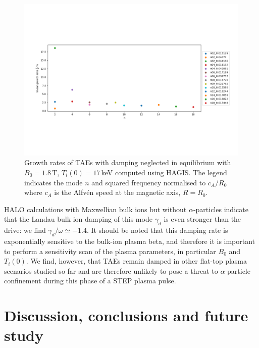 \documentclass[10pt, a4paper, twoside]{article}
\begin{document}
\begin{figure}[htpb]
    \centering
    \includegraphics[width=1.0\linewidth]{Figures/TAE_figure.pdf}
    \caption{Growth rates of TAEs with damping neglected in equilibrium with $B_0 = 1.8\,$T, $T_i(0) = 17\,$keV computed using HAGIS. The legend indicates the mode $n$ and squared frequency normalised to $c_A/R_0$ where $c_A$ is the Alfv\'en speed at the magnetic axis, $R=R_0$.}
    \label{fig:TAEs}
\end{figure}

HALO calculations with Maxwellian bulk ions but without $\alpha$-particles indicate that the Landau bulk ion damping of this mode $\gamma_d$ is even stronger than the drive: we find $\gamma_d/\omega \simeq -1.4$. It should be noted that this damping rate is exponentially sensitive to the bulk-ion plasma beta, and therefore it is important to perform a sensitivity scan of the plasma parameters, in particular $B_0$ and $T_i(0)$. We find, however, that TAEs remain damped in other flat-top plasma scenarios studied so far and are therefore unlikely to pose a threat to $\alpha$-particle confinement during this phase of a STEP plasma pulse.        

\section{Discussion, conclusions and future study}
\label{sec:discussion_and_conclusions}
\end{document}
